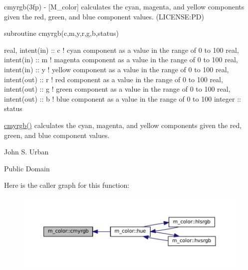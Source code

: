 \begin{DoxyDescription}
\item[\label{_CMYRGB}%
N\+A\+ME ]cmyrgb(3fp) -\/ \mbox{[}M\+\_\+color\mbox{]} calculates the cyan, magenta, and yellow components given the red, green, and blue component values. (L\+I\+C\+E\+N\+SE\+:PD) 


\item[S\+Y\+N\+O\+P\+S\+IS ]
\begin{DoxyPre}
    subroutine cmyrgb(c,m,y,r,g,b,status)\end{DoxyPre}



\begin{DoxyPre}     real, intent(in)  :: c ! cyan component as a value in the range of 0 to 100
     real, intent(in)  :: m ! magenta component as a value in the range of 0 to 100
     real, intent(in)  :: y ! yellow component as a value in the range of 0 to 100
     real, intent(out) :: r ! red component as a value in the range of 0 to 100
     real, intent(out) :: g ! green component as a value in the range of 0 to 100
     real, intent(out) :: b ! blue component as a value in the range of 0 to 100
     integer           :: status
    \end{DoxyPre}
 


\item[D\+E\+S\+C\+R\+I\+P\+T\+I\+ON ]\mbox{\hyperlink{namespacem__color_ab91687e87d0901874e52efe5933e3044}{cmyrgb()}} calculates the cyan, magenta, and yellow components given the red, green, and blue component values.




\item[A\+U\+T\+H\+OR ]

John S. Urban




\item[L\+I\+C\+E\+N\+SE ]

Public Domain




\end{DoxyDescription}Here is the caller graph for this function\+:\nopagebreak
\begin{figure}[H]
\begin{center}
\leavevmode
\includegraphics[width=350pt]{namespacem__color_ab91687e87d0901874e52efe5933e3044_icgraph}
\end{center}
\end{figure}
\mbox{\label{namespacem__color_a84a36043d278bc56a7148483a862dec8}} 
